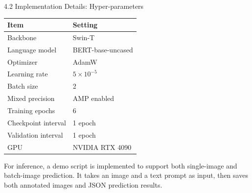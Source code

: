 \documentclass[aspectratio=169,10pt]{beamer}
\begin{document}
\begin{frame}{4.2 Implementation Details: Hyper-parameters}
\small
\begin{table}
\centering
\begin{tabular}{ll}
\hline
\textbf{Item} & \textbf{Setting} \\
\hline
Backbone & Swin-T \\
Language model & BERT-base-uncased \\
Optimizer & AdamW \\
Learning rate & $5 \times 10^{-5}$ \\
Batch size & 2 \\
Mixed precision & AMP enabled \\
Training epochs & 6 \\
Checkpoint interval & 1 epoch \\
Validation interval & 1 epoch \\
GPU & NVIDIA RTX 4090 \\
\hline
\end{tabular}
\end{table}

\vspace{0.5em}
\small
For inference, a demo script is implemented to support both single-image and batch-image prediction. It takes an image and a text prompt as input, then saves both annotated images and JSON prediction results.
\end{frame}
\end{document}

